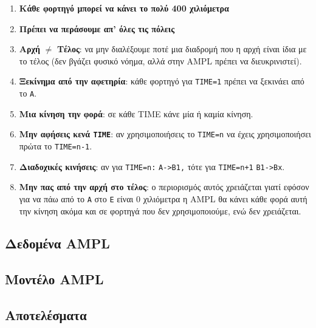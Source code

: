 \documentclass[
]{article}
\begin{document}
\begin{enumerate}
\def\labelenumi{\arabic{enumi}.}
\item
  \textbf{Κάθε φορτηγό μπορεί να κάνει το πολύ 400 χιλιόμετρα}
\item
  \textbf{Πρέπει να περάσουμε απ' όλες τις πόλεις}
\item
  \textbf{Αρχή} \(\neq\) \textbf{Τέλος}: να μην διαλέξουμε ποτέ μια διαδρομή που η αρχή
  είναι ίδια με το τέλος (δεν βγάζει φυσικό νόημα, αλλά στην AMPL
  πρέπει να διευκρινιστεί).
\item
  \textbf{Ξεκίνημα από την αφετηρία}: κάθε φορτηγό για \texttt{TIME=1} πρέπει να
  ξεκινάει από το \texttt{Α}.
\item
  \textbf{Μια κίνηση την φορά}: σε κάθε TIME κάνε μία ή καμία κίνηση.
\item
  \textbf{Μην αφήσεις κενά \texttt{TIME}}: αν χρησιμοποιήσεις το \texttt{TIME=n} να έχεις
  χρησιμοποιήσει πρώτα το \texttt{TIME=n-1}.
\item
  \textbf{Διαδοχικές κινήσεις}: αν για \texttt{ΤΙΜΕ=n:} \texttt{A-\textgreater{}B1,} τότε για
  \texttt{TIME=n+1} \texttt{B1-\textgreater{}Bx}.
\item
  \textbf{Μην πας από την αρχή στο τέλος}: ο περιορισμός αυτός χρειάζεται
  γιατί εφόσον για να πάω από το \texttt{Α} στο \texttt{Ε} είναι 0 χιλιόμετρα η AMPL
  θα κάνει κάθε φορά αυτή την κίνηση ακόμα και σε φορτηγά που δεν
  χρησιμοποιούμε, ενώ δεν χρειάζεται.
\end{enumerate}

\hypertarget{ux3b4ux3b5ux3b4ux3bfux3bcux3adux3bdux3b1-ampl}{%
\subsection{Δεδομένα AMPL}\label{ux3b4ux3b5ux3b4ux3bfux3bcux3adux3bdux3b1-ampl}}

\hypertarget{mux3bfux3bdux3c4ux3adux3bbux3bf-ampl}{%
\subsection{Mοντέλο AMPL}\label{mux3bfux3bdux3c4ux3adux3bbux3bf-ampl}}

\hypertarget{ux3b1ux3c0ux3bfux3c4ux3b5ux3bbux3adux3c3ux3bcux3b1ux3c4ux3b1}{%
\subsection{Αποτελέσματα}\label{ux3b1ux3c0ux3bfux3c4ux3b5ux3bbux3adux3c3ux3bcux3b1ux3c4ux3b1}}
\end{document}
